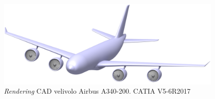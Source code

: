 \begin {figure} [h!]
\centering
\includegraphics[width= \textwidth ]{images/fileImg/Parte_3-Aerodinamica_Velivolo_A340-200/RenderingA340-200.png}
\caption{\footnotesize \emph{Rendering} CAD velivolo Airbus A340-200. CATIA V5-6R2017}
\label {fig:V3}
\end {figure}


